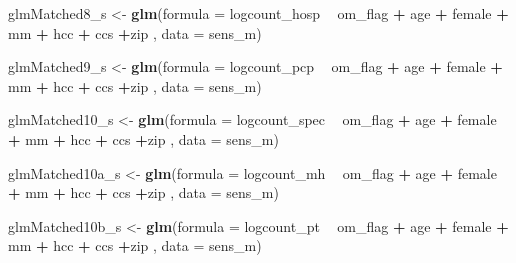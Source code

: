 \documentclass[]{article}
\newenvironment{Shaded}{\begin{snugshade}}{\end{snugshade}}
\newcommand{\KeywordTok}[1]{\textcolor[rgb]{0.13,0.29,0.53}{\textbf{#1}}}
\newcommand{\DataTypeTok}[1]{\textcolor[rgb]{0.13,0.29,0.53}{#1}}
\newcommand{\StringTok}[1]{\textcolor[rgb]{0.31,0.60,0.02}{#1}}
\newcommand{\OperatorTok}[1]{\textcolor[rgb]{0.81,0.36,0.00}{\textbf{#1}}}
\newcommand{\NormalTok}[1]{#1}
\begin{document}
\begin{Shaded}
\begin{Highlighting}[]
\NormalTok{glmMatched8_s <-}\StringTok{ }\KeywordTok{glm}\NormalTok{(}\DataTypeTok{formula =}\NormalTok{ logcount_hosp }\OperatorTok{~}\StringTok{ }\NormalTok{om_flag }\OperatorTok{+}\StringTok{ }\NormalTok{age }\OperatorTok{+}\StringTok{ }\NormalTok{female }\OperatorTok{+}\StringTok{ }\NormalTok{mm }\OperatorTok{+}\StringTok{ }\NormalTok{hcc }\OperatorTok{+}\StringTok{ }\NormalTok{ccs }\OperatorTok{+}\NormalTok{zip ,}
                   \DataTypeTok{data    =}\NormalTok{ sens_m)}


\NormalTok{glmMatched9_s <-}\StringTok{ }\KeywordTok{glm}\NormalTok{(}\DataTypeTok{formula =}\NormalTok{ logcount_pcp }\OperatorTok{~}\StringTok{ }\NormalTok{om_flag }\OperatorTok{+}\StringTok{ }\NormalTok{age }\OperatorTok{+}\StringTok{ }\NormalTok{female }\OperatorTok{+}\StringTok{ }\NormalTok{mm }\OperatorTok{+}\StringTok{ }\NormalTok{hcc }\OperatorTok{+}\StringTok{ }\NormalTok{ccs }\OperatorTok{+}\NormalTok{zip ,}
                   \DataTypeTok{data    =}\NormalTok{ sens_m)}

\NormalTok{glmMatched10_s <-}\StringTok{ }\KeywordTok{glm}\NormalTok{(}\DataTypeTok{formula =}\NormalTok{ logcount_spec }\OperatorTok{~}\StringTok{ }\NormalTok{om_flag }\OperatorTok{+}\StringTok{ }\NormalTok{age }\OperatorTok{+}\StringTok{ }\NormalTok{female }\OperatorTok{+}\StringTok{ }\NormalTok{mm }\OperatorTok{+}\StringTok{ }\NormalTok{hcc }\OperatorTok{+}\StringTok{ }\NormalTok{ccs }\OperatorTok{+}\NormalTok{zip ,}
                    \DataTypeTok{data    =}\NormalTok{ sens_m)}



\NormalTok{glmMatched10a_s <-}\StringTok{ }\KeywordTok{glm}\NormalTok{(}\DataTypeTok{formula =}\NormalTok{ logcount_mh }\OperatorTok{~}\StringTok{ }\NormalTok{om_flag }\OperatorTok{+}\StringTok{ }\NormalTok{age }\OperatorTok{+}\StringTok{ }\NormalTok{female }\OperatorTok{+}\StringTok{ }\NormalTok{mm }\OperatorTok{+}\StringTok{ }\NormalTok{hcc }\OperatorTok{+}\StringTok{ }\NormalTok{ccs }\OperatorTok{+}\NormalTok{zip ,}
                     \DataTypeTok{data    =}\NormalTok{ sens_m)}



\NormalTok{glmMatched10b_s <-}\StringTok{ }\KeywordTok{glm}\NormalTok{(}\DataTypeTok{formula =}\NormalTok{ logcount_pt }\OperatorTok{~}\StringTok{ }\NormalTok{om_flag }\OperatorTok{+}\StringTok{ }\NormalTok{age }\OperatorTok{+}\StringTok{ }\NormalTok{female }\OperatorTok{+}\StringTok{ }\NormalTok{mm }\OperatorTok{+}\StringTok{ }\NormalTok{hcc }\OperatorTok{+}\StringTok{ }\NormalTok{ccs }\OperatorTok{+}\NormalTok{zip ,}
                     \DataTypeTok{data    =}\NormalTok{ sens_m)}



\end{Highlighting}
\end{Shaded}
\end{document}
